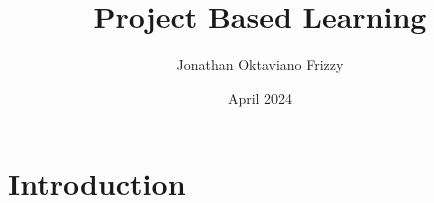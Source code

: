 \documentclass{article}
\title{Project Based Learning}
\author{Jonathan Oktaviano Frizzy}
\date{April 2024}
\begin{document}
\maketitle

\section{Introduction}
\end{document}

